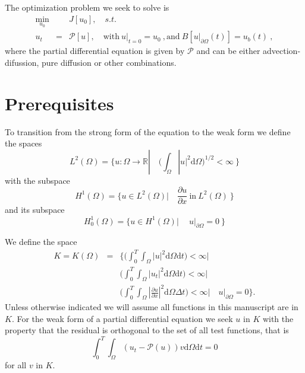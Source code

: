 \documentclass[10pt]{article}
\renewcommand{\d}{\mathrm{d}}
\newcommand{\dt}{\Delta t}
\begin{document}
{The optimization problem we seek to solve is
\begin{eqnarray}
\min_{u_0} &&J[u_0], \quad s.t. \\ \nonumber
u_t&=&\mathcal{P}[u], \quad \text{with}\ u|_{t=0}=u_0\ , \text{and} \  B[u|_{\partial \Omega}(t)]= u_b(t)\ ,
\label{optimizationproblem}
\end{eqnarray}
where the partial differential equation is given by $\mathcal P$ and can be either advection-difussion, pure diffusion or other combinations.

\section{Prerequisites}

To transition from the strong form of the equation to the weak form we define the spaces
$$
L^2(\Omega)=\lbrace u :\Omega\rightarrow \mathbb R |\quad \bigg(\int_{\Omega} |u|^2 \d \Omega \bigg)^{1/2}<\infty\ \rbrace
$$
with the subspace
$$
H^1(\Omega)=\lbrace u \in L^2(\Omega) |\quad \frac{\partial u}{\partial  x} \ \text{in}\  L^2(\Omega)\ \rbrace
$$
and its subspace
$$
H^1_0(\Omega)=\lbrace u \in H^1(\Omega) |\quad \ u|_{\partial\Omega}=0 \ \rbrace
$$

We define the space
\begin{eqnarray*}
K  =   K (\Omega) & = & \lbrace \bigg(\int_0^T \int_{\Omega} |u|^2 \d \Omega \d t \bigg) < \infty | \\
                  &   &  \bigg(\int_0^T \int_{\Omega} |u_t|^2 \d \Omega \d t \bigg) < \infty | \\
                  &   &  \bigg(\int_0^T \int_{\Omega} |\frac{\partial u}{\partial  x}|^2 \d \Omega \dt \bigg) < \infty | \quad  u|_{\partial\Omega}=0 \rbrace.
\end{eqnarray*}
Unless otherwise indicated we will assume all functions in this manuscript are in $K$.
For the weak form of a partial differential equation we seek $ u $ in $K$ with the property that the residual is orthogonal to the set of all test functions,
that is
\[
\int_0^T \int_{\Omega} ( u_t-\mathcal P( u))  v \d \Omega \d t = 0
\]
for all $ v$ in $K$.

}
\end{document}
